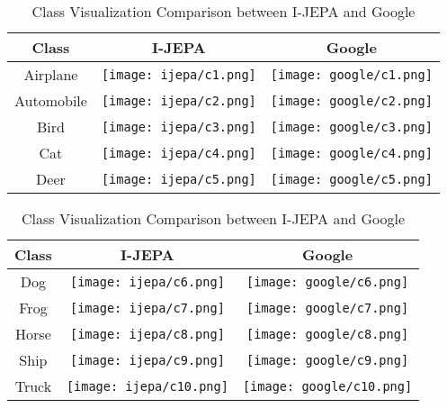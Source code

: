 \begin{table}[h]
\centering
\begin{minipage}{0.48\textwidth}
\centering
\begin{tabular}{|c|c|c|}
\hline
Class & I-JEPA & Google \\
\hline
Airplane & \texttt{[image: ijepa/c1.png]} & \texttt{[image: google/c1.png]} \\
\hline
Automobile & \texttt{[image: ijepa/c2.png]} & \texttt{[image: google/c2.png]} \\
\hline
Bird & \texttt{[image: ijepa/c3.png]} & \texttt{[image: google/c3.png]} \\
\hline
Cat & \texttt{[image: ijepa/c4.png]} & \texttt{[image: google/c4.png]} \\
\hline
Deer & \texttt{[image: ijepa/c5.png]} & \texttt{[image: google/c5.png]} \\
\hline
\end{tabular}
\end{minipage}
\hfill
\begin{minipage}{0.48\textwidth}
\centering
\begin{tabular}{|c|c|c|}
\hline
Class & I-JEPA & Google \\
\hline
Dog & \texttt{[image: ijepa/c6.png]} & \texttt{[image: google/c6.png]} \\
\hline
Frog & \texttt{[image: ijepa/c7.png]} & \texttt{[image: google/c7.png]} \\
\hline
Horse & \texttt{[image: ijepa/c8.png]} & \texttt{[image: google/c8.png]} \\
\hline
Ship & \texttt{[image: ijepa/c9.png]} & \texttt{[image: google/c9.png]} \\
\hline
Truck & \texttt{[image: ijepa/c10.png]} & \texttt{[image: google/c10.png]} \\
\hline
\end{tabular}
\end{minipage}
\caption{Class Visualization Comparison between I-JEPA and Google}
\label{tab:model_comparison}
\end{table}
